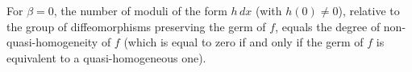 For $\beta = 0$, the number of moduli of the form $h \, dx$ (with $h(0) \neq 0$), relative to the group of diffeomorphisms preserving the germ of $f$, equals the degree of non-quasi-homogeneity of $f$ (which is equal to zero if and only if the germ of $f$ is equivalent to a quasi-homogeneous one).
